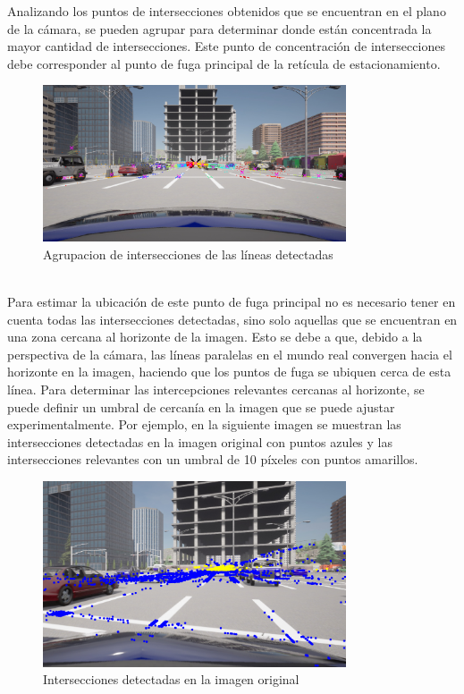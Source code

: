 \begin{itemize}
    Analizando los puntos de intersecciones obtenidos que se encuentran en el plano de la cámara, se pueden agrupar para determinar donde están
    concentrada la mayor cantidad de intersecciones.
    Este punto de concentración de intersecciones debe corresponder al punto de fuga principal de la retícula de estacionamiento.
    \begin{figure}[!ht]
        \centering
        \includegraphics[width=0.8\textwidth]{img/reticule/svd-km}
        \caption{Agrupacion de intersecciones de las líneas detectadas}
        \label{fig:intersections}
    \end{figure}

    \\Para estimar la ubicación de este punto de fuga principal no es necesario tener en cuenta todas las intersecciones detectadas,
    sino solo aquellas que se encuentran en una zona cercana al horizonte de la imagen.
    Esto se debe a que, debido a la perspectiva de la cámara, las líneas paralelas en el mundo real convergen hacia el horizonte en la imagen,
    haciendo que los puntos de fuga se ubiquen cerca de esta línea.
    Para determinar las intercepciones relevantes cercanas al horizonte, se puede definir un umbral de cercanía en la imagen que se puede ajustar experimentalmente.
    Por ejemplo, en la siguiente imagen se muestran las intersecciones detectadas en la imagen original con puntos azules
    y las intersecciones relevantes con un umbral de 10 píxeles con puntos amarillos.
    \begin{figure}[!ht]
        \centering
        \includegraphics[width=0.8\textwidth]{img/reticule/relevantInter}
        \caption{Intersecciones detectadas en la imagen original}
        \label{fig:relevantInter}
    \end{figure}


\end{itemize}
